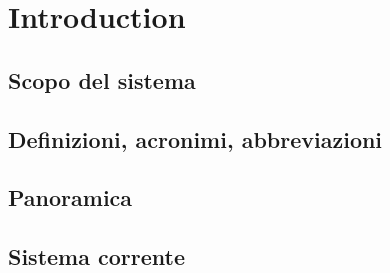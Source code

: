 \chapter{Introduction}
\section{Scopo del sistema}
\section{Definizioni, acronimi, abbreviazioni}
\section{Panoramica}
\section{Sistema corrente}
